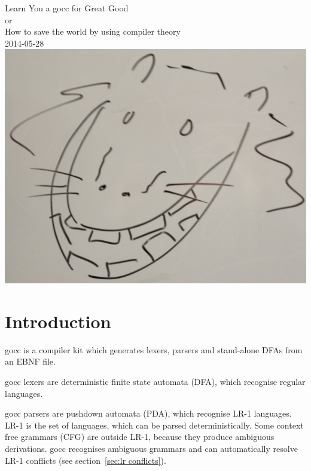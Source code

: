 \documentclass[12pt]{article}
\begin{document}
\begin{center}
	{\Huge Learn You a gocc for Great Good} \\
	{\large or \\
	How to save the world by using compiler theory \\
	\vspace{1cm}
	2014-05-28}\\
	\vspace{1cm}
	\includegraphics[scale=.1]{gocc}
\end{center}
\tableofcontents

\newcommand{\TBD}{\textcolor{red}{TBD}}
\newcommand{\TBDx}[1]{\textcolor{red}{TBD:} #1}
\newcommand{\Go}{{\em Go}\ }
\newcommand{\Code}[1]{{\bf #1} }
\newcommand{\gocc}{{\em gocc}\ }
\newcommand{\Clang}{{\em C} language}

\section{Introduction}
	gocc is a compiler kit which generates lexers, parsers and stand-alone DFAs from an EBNF file.

	gocc lexers are deterministic finite state automata (DFA), which recognise regular languages.

	gocc parsers are pushdown automata (PDA), which recognise LR-1 languages. LR-1 is the set of languages, which can be parsed deterministically. Some context free grammars (CFG) are outside LR-1, because they produce ambiguous derivations. gocc recognises ambiguous grammars and can automatically resolve LR-1 conflicts (see section~\ref{sec:lr conflicts}).
\end{document}
